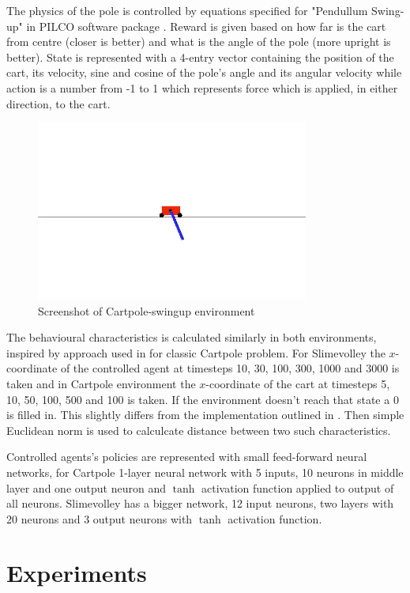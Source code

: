 The physics of the pole is controlled by equations specified for "Pendullum Swing-up" in PILCO software package \cite{pilco2013}. Reward is given based on how far is the cart from centre (closer is better) and what is the angle of the pole (more upright is better). State is represented with a 4-entry vector containing the position of the cart, its velocity, sine and cosine of the pole's angle and its angular velocity while action is a number from -1 to 1 which represents force which is applied, in either direction, to the cart.

\begin{figure}[h]
    \caption{Screenshot of Cartpole-swingup environment}
    \includegraphics[width=0.8\textwidth]{img/cartpole.png}
\end{figure}
% 
The behavioural characteristics is calculated similarly in both environments, inspired by approach used in \cite{Inden2013} for classic Cartpole problem. For Slimevolley the $x$-coordinate of the controlled agent at timesteps 10, 30, 100, 300, 1000 and 3000 is taken and in Cartpole environment the $x$-coordinate of the cart at timesteps 5, 10, 50, 100, 500 and 100 is taken. If the environment doesn't reach that state a 0 is filled in. This slightly differs from the implementation outlined in \cite{Inden2013}. Then simple Euclidean norm is used to calculcate distance between two such characteristics.

Controlled agents's policies are represented with small feed-forward neural networks, for Cartpole 1-layer neural network with 5 inputs, 10 neurons in middle layer and one output neuron and $\tanh$ activation function applied to output of all neurons. Slimevolley has a bigger network, 12 input neurons, two layers with 20 neurons and 3 output neurons with $\tanh$ activation function.

\section{Experiments}

